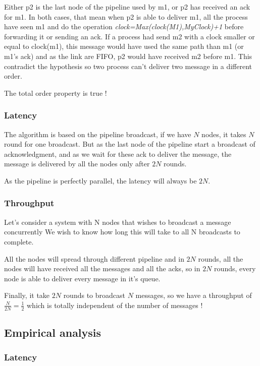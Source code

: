 \documentclass[a4paper]{article}
\begin{document}
\begin{itemize}
        Either p2 is the last node of the pipeline used by m1, or p2 has
        received an ack for m1. In both cases, that mean when p2 is able to
        deliver m1, all the process have seen m1 and do the operation 
        \textit{clock=Max(clock(M1),MyClock)+1} before forwarding it or 
        sending an ack. If a process had send
        m2 with a clock smaller or equal to clock(m1), this message would have
        used the same path than m1 (or m1's ack) and as the link are FIFO, p2
        would have received m2 before m1. This contradict the hypothesis so two
        process can't deliver two message in a different order.

        The total order property is true !

\end{itemize}
\label{sec:pipelineack-proof}


\subsubsection*{Latency}
The algorithm is based on the pipeline broadcast, if we have $N$ nodes, it takes
$N$ round for one broadcast. But as the last node of the pipeline start a
broadcast of acknowledgment, and as we wait for these ack to deliver the
message, the message is delivered by all the nodes only after $2N$ rounds.

As the pipeline is perfectly parallel, the latency will always be $2N$.
\subsubsection*{Throughput}
Let’s consider a system with N nodes that wishes to broadcast a message concurrently
We wish to know how long this will take to all N broadcasts to
complete.

All the nodes will spread through different pipeline and in $2N$ rounds, all the
nodes will have received all the messages and all the acks, so in $2N$ rounds,
every node is able to deliver every message in it's queue.

Finally, it take $2N$ rounds to broadcast $N$ messages, so we have a throughput
of $\frac{N}{2N}=\frac{1}{2}$ which is totally independent of the number of
messages !
\subsection{Empirical analysis}

\subsubsection*{Latency}
\end{document}
